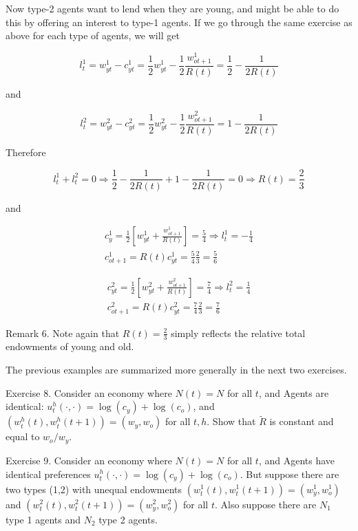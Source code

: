 \documentclass[10pt]{article}
\begin{document}
Now type-2 agents want to lend when they are young, and might be able to do this by offering an interest to type-1 agents. If we go through the same exercise as above for each type of agents, we will get

$$
l_{t}^{1}=w_{y t}^{1}-c_{y t}^{1}=\frac{1}{2} w_{y t}^{1}-\frac{1}{2} \frac{w_{o t+1}^{1}}{R(t)}=\frac{1}{2}-\frac{1}{2 R(t)}
$$

and

$$
l_{t}^{2}=w_{y t}^{2}-c_{y t}^{2}=\frac{1}{2} w_{y t}^{2}-\frac{1}{2} \frac{w_{o t+1}^{2}}{R(t)}=1-\frac{1}{2 R(t)}
$$

Therefore

$$
l_{t}^{1}+l_{t}^{2}=0 \Rightarrow \frac{1}{2}-\frac{1}{2 R(t)}+1-\frac{1}{2 R(t)}=0 \Rightarrow R(t)=\frac{2}{3}
$$

and

$$
\begin{gathered}
c_{y}^{1}=\frac{1}{2}\left[w_{y t}^{1}+\frac{w_{o t+1}^{1}}{R(t)}\right]=\frac{5}{4} \Rightarrow l_{t}^{1}=-\frac{1}{4} \\
c_{o t+1}^{1}=R(t) c_{y t}^{1}=\frac{5}{4} \frac{2}{3}=\frac{5}{6}
\end{gathered}
$$

$$
\begin{gathered}
c_{y t}^{2}=\frac{1}{2}\left[w_{y t}^{2}+\frac{w_{o t+1}^{2}}{R(t)}\right]=\frac{7}{4} \Rightarrow l_{t}^{2}=\frac{1}{4} \\
c_{o t+1}^{2}=R(t) c_{y t}^{2}=\frac{7}{4} \frac{2}{3}=\frac{7}{6}
\end{gathered}
$$

Remark 6. Note again that $R(t)=\frac{2}{3}$ simply reflects the relative total endowments of young and old.

The previous examples are summarized more generally in the next two exercises.

Exercise 8. Consider an economy where $N(t)=N$ for all $t$, and Agents are identical: $u_{t}^{h}(\cdot, \cdot)=\log \left(c_{y}\right)+\log \left(c_{o}\right)$, and $\left(w_{t}^{h}(t), w_{t}^{h}(t+1)\right)=\left(w_{y}, w_{o}\right)$ for all $t, h$. Show that $\tilde{R}$ is constant and equal to $w_{o} / w_{y}$.

Exercise 9. Consider an economy where $N(t)=N$ for all $t$, and Agents have identical preferences $u_{t}^{h}(\cdot, \cdot)=\log \left(c_{y}\right)+\log \left(c_{o}\right)$. But suppose there are two types (1,2) with unequal endowments $\left(w_{t}^{1}(t), w_{t}^{1}(t+1)\right)=\left(w_{y}^{1}, w_{o}^{1}\right)$ and $\left(w_{t}^{2}(t), w_{t}^{2}(t+1)\right)=\left(w_{y}^{2}, w_{o}^{2}\right)$ for all $t$. Also suppose there are $N_{1}$ type 1 agents and $N_{2}$ type 2 agents.
\end{document}
